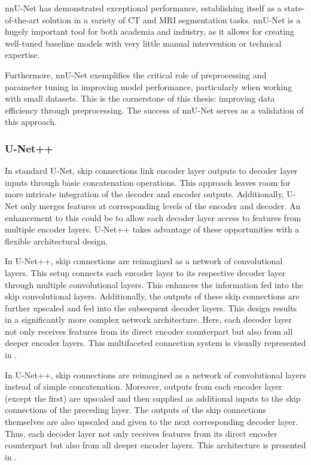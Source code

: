  nnU-Net has demonstrated exceptional performance, establishing itself as a state-of-the-art solution in a variety of CT and MRI segmentation tasks. nnU-Net is a hugely important tool for both academia and industry, as it allows for creating well-tuned baseline models with very little manual intervention or technical expertise.
 
 Furthermore, nnU-Net exemplifies the critical role of preprocessing and parameter tuning in improving model performance, particularly when working with small datasets. This is the cornerstone of this thesis: improving data efficiency through preprocessing. The success of nnU-Net serves as a validation of this approach.
 
 \subsubsection{U-Net++}
 
In standard U-Net, skip connections link encoder layer outputs to decoder layer inputs through basic concatenation operations. This approach leaves room for more intricate integration of the decoder and encoder outputs. Additionally, U-Net only merges features at corresponding levels of the encoder and decoder. An enhancement to this could be to allow each decoder layer access to features from multiple encoder layers. U-Net++ \cite{zhou2019unetplusplus} takes advantage of these opportunities with a flexible architectural design.

In U-Net++, skip connections are reimagined as a network of convolutional layers. This setup connects each encoder layer to its respective decoder layer through multiple convolutional layers.  This enhances the information fed into the skip convolutional layers. Additionally, the outputs of these skip connections are further upscaled and fed into the subsequent decoder layers. This design results in a significantly more complex network architecture. Here, each decoder layer not only receives features from its direct encoder counterpart but also from all deeper encoder layers. This multifaceted connection system is visually represented in .
 
 In U-Net++, skip connections are reimagined as a network of convolutional layers instead of simple concatenation. Moreover, outputs from each encoder layer (except the first) are upscaled and then supplied as additional inputs to the skip connections of the preceding layer. The outputs of the skip connections themselves are also upscaled and given to the next corresponding decoder layer. Thus, each decoder layer not only receives features from its direct encoder counterpart but also from all deeper encoder layers. This architecture is presented in .
 
